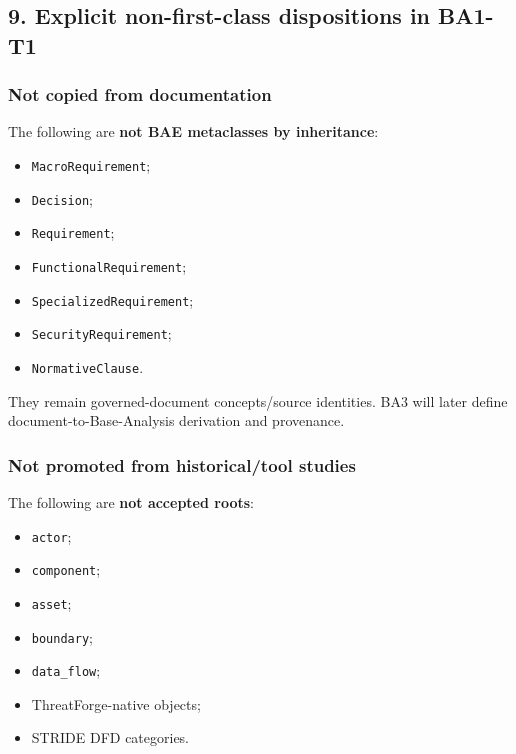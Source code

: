 \documentclass[
]{article}
\providecommand{\tightlist}{%
  \setlength{\itemsep}{0pt}\setlength{\parskip}{0pt}}
\begin{document}
\subsection{9. Explicit non-first-class dispositions in
BA1-T1}\label{9-explicit-non-first-class-dispositions-in-ba1-t1}

\subsubsection{Not copied from
documentation}\label{not-copied-from-documentation}

The following are \textbf{not BAE metaclasses by inheritance}:

\begin{itemize}
\tightlist
\item
  \texttt{MacroRequirement};
\item
  \texttt{Decision};
\item
  \texttt{Requirement};
\item
  \texttt{FunctionalRequirement};
\item
  \texttt{SpecializedRequirement};
\item
  \texttt{SecurityRequirement};
\item
  \texttt{NormativeClause}.
\end{itemize}

They remain governed-document concepts/source identities. BA3 will later
define document-to-Base-Analysis derivation and provenance.

\subsubsection{Not promoted from historical/tool
studies}\label{not-promoted-from-historicaltool-studies}

The following are \textbf{not accepted roots}:

\begin{itemize}
\tightlist
\item
  \texttt{actor};
\item
  \texttt{component};
\item
  \texttt{asset};
\item
  \texttt{boundary};
\item
  \texttt{data\_flow};
\item
  ThreatForge-native objects;
\item
  STRIDE DFD categories.
\end{itemize}
\end{document}
